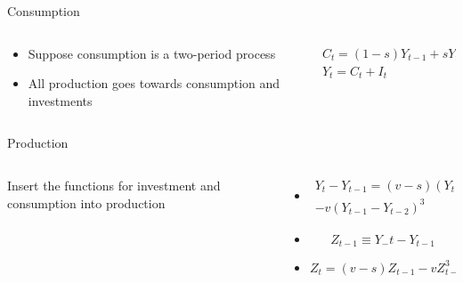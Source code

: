 \documentclass{beamer}
\begin{document}
\begin{frame}{Consumption}
	\begin{columns}
		\begin{column}{0.5\textwidth}
			\begin{itemize}
				\item
					Suppose consumption is a two-period process
				\item
					All production goes towards consumption and investments
			\end{itemize}
		\end{column}

		\begin{column}{0.5\textwidth}
			\begin{gather*}
				C_t=(1-s)Y_{t-1}+sY_{t-2}\\
				Y_t=C_t+I_t
			\end{gather*}
		\end{column}
	\end{columns}
\end{frame}

\begin{frame}{Production}
	\begin{columns}
		\begin{column}{0.3\textwidth}
			\centering
			Insert the functions for investment and consumption into production
		\end{column}
		\begin{column}{0.7\textwidth}
			\begin{itemize}
				\item
					\begin{equation*}
						\begin{split}
						Y_t-Y_{t-1}=(v-s)(Y_{t-1}-Y_{t-2})\\
						-v(Y_{t-1}-Y_{t-2})^3
					\end{split}
					\end{equation*}

				\item
					\begin{equation*}
						Z_{t-1}\equiv Y_-t-Y_{t-1}
					\end{equation*}

				\item
					\begin{equation*}
						Z_t=(v-s)Z_{t-1}-vZ^3_{t-1}
					\end{equation*}
			\end{itemize}
		\end{column}
	\end{columns}
\end{frame}
\end{document}
